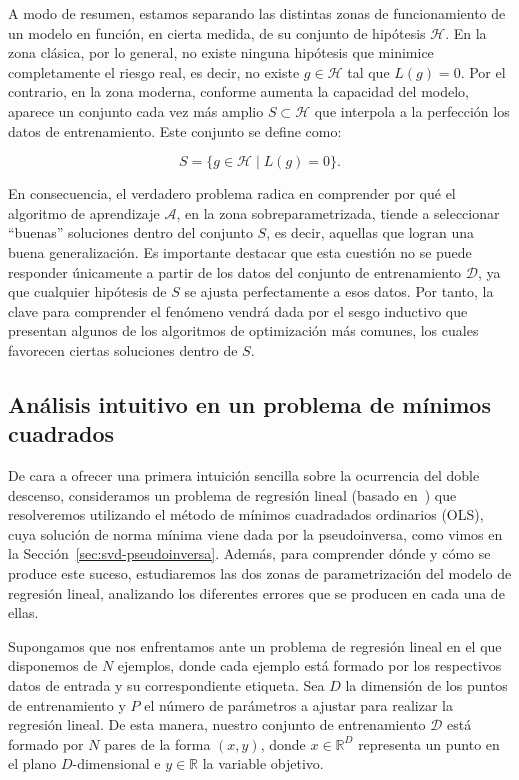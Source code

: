 A modo de resumen, estamos separando las distintas zonas de funcionamiento de un modelo en función, en cierta medida, de su conjunto de hipótesis $\mathcal{H}$. En la zona clásica, por lo general, no existe ninguna hipótesis que minimice completamente el riesgo real, es decir, no existe $g \in \mathcal{H}$ tal que $L(g) = 0$. Por el contrario, en la zona moderna, conforme aumenta la capacidad del modelo, aparece un conjunto cada vez más amplio $S \subset \mathcal{H}$ que interpola a la perfección los datos de entrenamiento. Este conjunto se define como:  

\[
    S = \{ g \in \mathcal{H} \mid L(g) = 0 \}.
\]

En consecuencia, el verdadero problema radica en comprender por qué el algoritmo de aprendizaje $\mathcal{A}$, en la zona sobreparametrizada, tiende a seleccionar ``buenas'' soluciones dentro del conjunto $S$, es decir, aquellas que logran una buena generalización. Es importante destacar que esta cuestión no se puede responder únicamente a partir de los datos del conjunto de entrenamiento $\mathcal{D}$, ya que cualquier hipótesis de $S$ se ajusta perfectamente a esos datos. Por tanto, la clave para comprender el fenómeno vendrá dada por el sesgo inductivo que presentan algunos de los algoritmos de optimización más comunes, los cuales favorecen ciertas soluciones dentro de $S$.\newline

\subsection{Análisis intuitivo en un problema de mínimos cuadrados}\label{subsec:analisis-intuitivo-minimos-cuadrados}

De cara a ofrecer una primera intuición sencilla sobre la ocurrencia del doble descenso, consideramos un problema de regresión lineal (basado en~\cite{Schaeffer2023}) que resolveremos utilizando el método de mínimos cuadradados ordinarios (OLS), cuya solución de norma mínima viene dada por la pseudoinversa, como vimos en la Sección~\ref{sec:svd-pseudoinversa}. Además, para comprender dónde y cómo se produce este suceso, estudiaremos las dos zonas de parametrización del modelo de regresión lineal, analizando los diferentes errores que se producen en cada una de ellas.\newline

Supongamos que nos enfrentamos ante un problema de regresión lineal en el que disponemos de $N$ ejemplos, donde cada ejemplo está formado por los respectivos datos de entrada y su correspondiente etiqueta. Sea $D$ la dimensión de los puntos de entrenamiento y $P$ el número de parámetros a ajustar para realizar la regresión lineal. De esta manera, nuestro conjunto de entrenamiento $\mathcal{D}$ está formado por $N$ pares de la forma $(x,y)$, donde $x \in \mathbb{R}^{D}$ representa un punto en el plano $D$-dimensional e $y \in \mathbb{R}$ la variable objetivo.\newline

